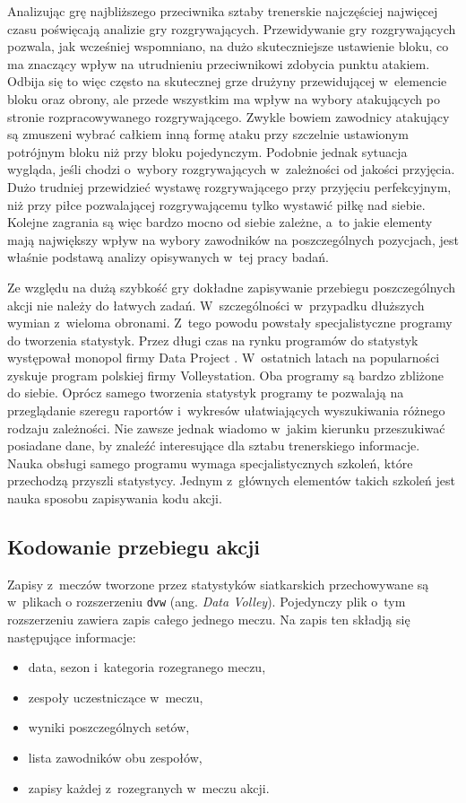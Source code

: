 \documentclass[a4paper,twoside,12pt]{book}
\newcommand{\obcy}[1]{\emph{#1}}
\renewcommand{\ang}[1]{{\selectlanguage{british}\obcy{#1}}}
\begin{document}
Analizując grę najbliższego przeciwnika sztaby trenerskie najczęściej najwięcej czasu poświęcają analizie gry rozgrywających. Przewidywanie gry rozgrywających pozwala, jak wcześniej wspomniano, na dużo skuteczniejsze ustawienie bloku, co ma znaczący wpływ na utrudnieniu przeciwnikowi zdobycia punktu atakiem. Odbija się to więc często na skutecznej grze drużyny przewidującej w~elemencie bloku oraz obrony, ale przede wszystkim ma wpływ na wybory atakujących po stronie rozpracowywanego rozgrywającego. Zwykle bowiem zawodnicy atakujący są zmuszeni wybrać całkiem inną formę ataku przy szczelnie ustawionym potrójnym bloku niż przy bloku pojedynczym. Podobnie jednak sytuacja wygląda, jeśli chodzi o~wybory rozgrywających w~zależności od jakości przyjęcia. Dużo trudniej przewidzieć wystawę rozgrywającego przy przyjęciu perfekcyjnym, niż przy piłce pozwalającej rozgrywającemu tylko wystawić piłkę nad siebie. Kolejne zagrania są więc bardzo mocno od siebie zależne, a~to jakie elementy mają największy wpływ na wybory zawodników na poszczególnych pozycjach, jest właśnie podstawą analizy opisywanych w~tej pracy badań.

Ze względu na dużą szybkość gry dokładne zapisywanie przebiegu poszczególnych akcji nie należy do łatwych zadań. W~szczególności w~przypadku dłuższych wymian z~wieloma obronami. Z~tego powodu powstały specjalistyczne programy do tworzenia statystyk. Przez długi czas na rynku programów do statystyk występował monopol firmy Data Project \cite{bib:inzynier}. W~ostatnich latach na popularności zyskuje program polskiej firmy Volleystation. Oba programy są bardzo zbliżone do siebie. Oprócz samego tworzenia statystyk programy te pozwalają na przeglądanie szeregu raportów i~wykresów ułatwiających wyszukiwania różnego rodzaju zależności. Nie zawsze jednak wiadomo w~jakim kierunku przeszukiwać posiadane dane, by znaleźć interesujące dla sztabu trenerskiego informacje. Nauka obsługi samego programu wymaga specjalistycznych szkoleń, które przechodzą przyszli statystycy. Jednym z~głównych elementów takich szkoleń jest nauka sposobu zapisywania kodu akcji.

\subsection{Kodowanie przebiegu akcji}
\label{roz:analiza-kodu}

Zapisy z~meczów tworzone przez statystyków siatkarskich przechowywane są w~plikach
o rozszerzeniu \texttt{dvw} (ang. \ang{Data Volley}). Pojedynczy plik o~tym rozszerzeniu zawiera zapis całego jednego meczu. Na zapis ten składją się następujące informacje:
\begin{itemize}
\item data, sezon i~kategoria rozegranego meczu,
\item zespoły uczestniczące w~meczu,
\item wyniki poszczególnych setów,
\item lista zawodników obu zespołów,
\item zapisy każdej z~rozegranych w~meczu akcji.
\end{itemize}
\end{document}
